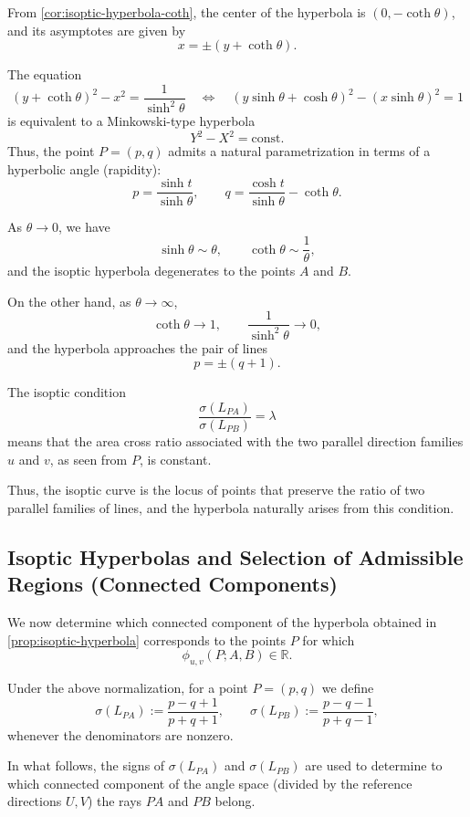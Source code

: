 \documentclass[12pt]{article}
\begin{document}
\begin{remark}
From \cref{cor:isoptic-hyperbola-coth},
the center of the hyperbola is $(0,-\coth\theta)$,
and its asymptotes are given by
\[
x=\pm(y+\coth\theta).
\]
\end{remark}

\begin{remark}
The equation
\[
(y+\coth\theta)^2-x^2=\frac{1}{\sinh^2\theta}
\quad\iff\quad
(y\sinh\theta+\cosh\theta)^2-(x\sinh\theta)^2=1
\]
is equivalent to a Minkowski-type hyperbola
\[
Y^2-X^2=\text{const}.
\]
Thus, the point $P=(p,q)$ admits a natural parametrization
in terms of a hyperbolic angle (rapidity):
\[
p=\frac{\sinh t}{\sinh\theta},\qquad
q=\frac{\cosh t}{\sinh\theta}-\coth\theta.
\]
\end{remark}

\begin{remark}
As $\theta\to0$, we have
\[
\sinh\theta\sim\theta,\qquad \coth\theta\sim\frac{1}{\theta},
\]
and the isoptic hyperbola degenerates to the points $A$ and $B$.

On the other hand, as $\theta\to\infty$,
\[
\coth\theta\to1,\qquad \frac{1}{\sinh^2\theta}\to0,
\]
and the hyperbola approaches the pair of lines
\[
p=\pm(q+1).
\]
\end{remark}

\begin{remark}
The isoptic condition
\[
\frac{\sigma(L_{PA})}{\sigma(L_{PB})}=\lambda
\]
means that the area cross ratio associated with the two parallel
direction families $u$ and $v$, as seen from $P$, is constant.

Thus, the isoptic curve is the locus of points that preserve
the ratio of two parallel families of lines,
and the hyperbola naturally arises from this condition.
\end{remark}

\subsection{Isoptic Hyperbolas and Selection of Admissible Regions (Connected Components)}

We now determine which connected component of the hyperbola
obtained in \cref{prop:isoptic-hyperbola}
corresponds to the points $P$ for which
\[
\phi_{u,v}(P;A,B)\in\mathbb{R}.
\]

\begin{definition}
\label{def:sigma-sign-component}
Under the above normalization, for a point $P=(p,q)$ we define
\[
\sigma(L_{PA}):=\frac{p-q+1}{p+q+1},\qquad
\sigma(L_{PB}):=\frac{p-q-1}{p+q-1},
\]
whenever the denominators are nonzero.

In what follows, the signs of $\sigma(L_{PA})$ and $\sigma(L_{PB})$
are used to determine to which connected component
of the angle space (divided by the reference directions $U,V$)
the rays $PA$ and $PB$ belong.
\end{definition}
\end{document}
